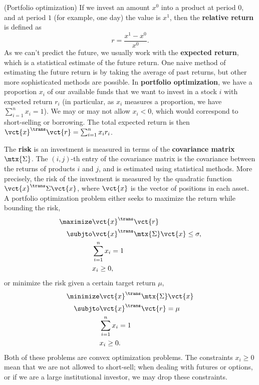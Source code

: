 \begin{example} (Portfolio optimization)
If we invest an amount $x^0$ into a product at period $0$, and at period $1$ (for example, one day) the value is $x^1$, then the \textbf{relative return} is defined as
\begin{equation*}
  r = \frac{x^{1}-x^{0}}{x^{0}}.
\end{equation*}
As we can't predict the future, we usually work with the \textbf{expected return}, which is a statistical estimate of the future return. One naive method of estimating the future return is by taking the average of past returns, but other more sophisticated methods are possible.
In \textbf{portfolio optimization}, we have a proportion $x_i$ of our available funds that we want to invest in a stock $i$ with expected return $r_i$ (in particular, as $x_i$ measures a proportion, we have $\sum_{i=1}^n x_i = 1$). We may or may not allow $x_i<0$, which would correspond to short-selling or borrowing.  
 The total expected return is then $\vct{x}^{\trans}\vct{r}=\sum_{i=1}^n x_ir_i$. 
 
 The \textbf{risk} is an investment is measured in terms of the \textbf{covariance matrix} $\mtx{\Sigma}$. The $(i,j)$-th entry of the covariance matrix is the covariance between the returns of products $i$ and $j$, and is estimated using statistical methods. More precisely, the risk of the investment is measured by the quadratic function $\vct{x}^{\trans}\Sigma\vct{x}$, where $\vct{x}$ is the vector of positions in each asset. A portfolio optimization problem either seeks to maximize the return while bounding the risk,
 \begin{align*}
  \maximize & \vct{x}^{\trans}\vct{r}\\
  \subjto & \vct{x}^{\trans}\mtx{\Sigma}\vct{x}\leq \sigma,\\
  & \sum_{i=1}^n x_i=1\\
  & x_i\geq 0,
 \end{align*}
or minimize the risk given a certain target return $\mu$,
\begin{align*}
 \minimize & \vct{x}^{\trans}\mtx{\Sigma}\vct{x}\\
 \subjto & \vct{x}^{\trans}\vct{r} = \mu\\
 & \sum_{i=1}^n x_i = 1\\
 & x_i\geq 0.
\end{align*}
Both of these problems are convex optimization problems. The constraints $x_i\geq 0$ mean that we are not allowed to short-sell; when dealing with futures or options, or if we are a large institutional investor, we may drop these constraints.
\end{example}

